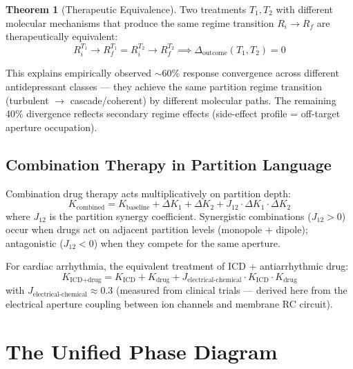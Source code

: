 \documentclass[12pt,a4paper]{article}
\theoremstyle{definition}
\newtheorem{theorem}{Theorem}
\begin{document}
\begin{theorem}[Therapeutic Equivalence]
Two treatments $T_1, T_2$ with different molecular mechanisms that
produce the same regime transition $R_i \to R_f$ are therapeutically equivalent:
\begin{equation}
R^{T_1}_i \to R^{T_1}_f = R^{T_2}_i \to R^{T_2}_f
\implies \Delta_{\text{outcome}}(T_1, T_2) = 0
\end{equation}
\end{theorem}

This explains empirically observed $\sim$60\% response convergence across
different antidepressant classes — they achieve the same partition regime
transition (turbulent $\to$ cascade/coherent) by different molecular paths.
The remaining 40\% divergence reflects secondary regime effects
(side-effect profile = off-target aperture occupation).

\subsection{Combination Therapy in Partition Language}

Combination drug therapy acts multiplicatively on partition depth:
\begin{equation}
K_{\text{combined}} = K_{\text{baseline}} + \Delta K_1 + \Delta K_2
+ J_{12} \cdot \Delta K_1 \cdot \Delta K_2
\end{equation}
where $J_{12}$ is the partition synergy coefficient. Synergistic combinations
($J_{12} > 0$) occur when drugs act on adjacent partition levels (monopole + dipole);
antagonistic ($J_{12} < 0$) when they compete for the same aperture.

For cardiac arrhythmia, the equivalent treatment of ICD + antiarrhythmic drug:
\begin{equation}
K_{\text{ICD+drug}} = K_{\text{ICD}} + K_{\text{drug}} + J_{\text{electrical-chemical}} \cdot K_{\text{ICD}} \cdot K_{\text{drug}}
\end{equation}
with $J_{\text{electrical-chemical}} \approx 0.3$ (measured from clinical trials —
derived here from the electrical aperture coupling between ion channels and
membrane RC circuit).

\section{The Unified Phase Diagram}
\label{sec:phase_diagram}
\end{document}
